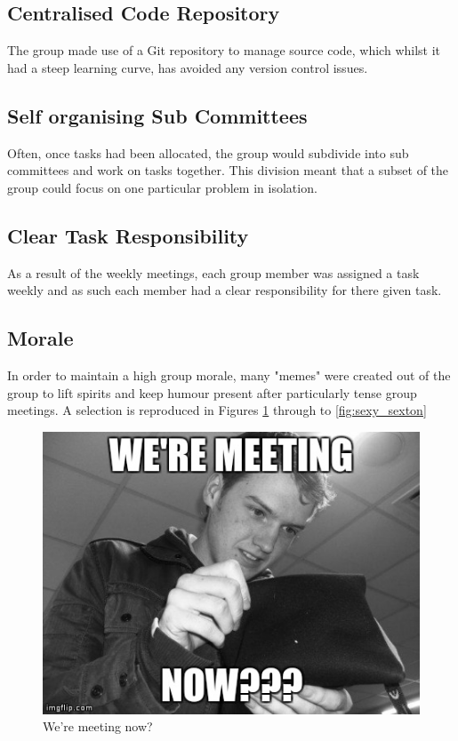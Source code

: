 \subsection{Centralised Code Repository}
The group made use of a Git repository to manage source code, which whilst it had a steep learning curve, has avoided any version control issues.\\

\subsection{Self organising Sub Committees}
Often, once tasks had been allocated, the group would subdivide into sub committees and work on tasks together. 
This division meant that a subset of the group could focus on one particular problem in isolation.\\

\subsection{Clear Task Responsibility}
As a result of the weekly meetings, each group member was assigned a task weekly and as such each member had a clear responsibility for there given task.\\

\subsection{Morale}
\label{morale}
In order to maintain a high group morale, many "memes" were created out of the group to lift spirits and keep humour present after particularly tense group meetings. A selection is reproduced in Figures \ref{fig:were_meeting_now?} through to \ref{fig:sexy_sexton}

\begin{figure}[h]
\begin{center}
\includegraphics[scale=0.4]{./design/nathan} 
\end{center}
\caption{We're meeting now?}
\label{fig:were_meeting_now?}
\end{figure} 

